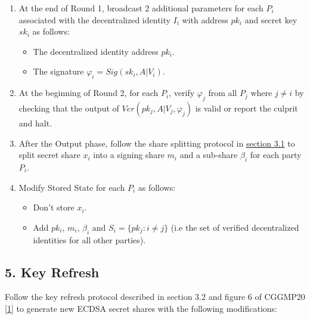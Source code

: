 \documentclass[
]{article}
\providecommand{\tightlist}{%
  \setlength{\itemsep}{0pt}\setlength{\parskip}{0pt}}
\begin{document}
\begin{enumerate}
\def\labelenumi{\arabic{enumi}.}
\tightlist
\item
  At the end of Round 1, broadcast 2 additional parameters for each
  \(P_i\) associated with the decentralized identity \(I_i\) with
  address \(pk_i\) and secret key \(sk_i\) as follows:

  \begin{itemize}
  \tightlist
  \item
    The decentralized identity address \(pk_i\).
  \item
    The signature \(\varphi _i = Sig(sk_i, A | V_i)\).
  \end{itemize}
\item
  At the beginning of Round 2, for each \(P_i\), verify \(\varphi _j\)
  from all \(P_j\) where \(j \neq i\) by checking that the output of
  \(Ver(pk_j, A | V_j, \varphi _j)\) is valid or report the culprit and
  halt.
\item
  After the Output phase, follow the share splitting protocol in
  \protect\hyperlink{share-splitting}{section 3.1} to split secret share
  \(x_i\) into a signing share \(m_i\) and a sub-share \(\beta _i\) for
  each party \(P_i\).
\item
  Modify Stored State for each \(P_i\) as follows:

  \begin{itemize}
  \tightlist
  \item
    Don't store \(x_i\).
  \item
    Add \(pk_i\), \(m_i\), \(\beta _i\) and
    \(S_i = \{ pk_j : i \neq j \}\) (i.e the set of verified
    decentralized identities for all other parties).
  \end{itemize}
\end{enumerate}

\hypertarget{key-refresh}{%
\subsection{5. Key Refresh}\label{key-refresh}}

Follow the key refresh protocol described in section 3.2 and figure 6 of
CGGMP20 {[}\protect\hyperlink{ref-cggmp20}{1}{]} to generate new ECDSA
secret shares with the following modifications:
\end{document}
